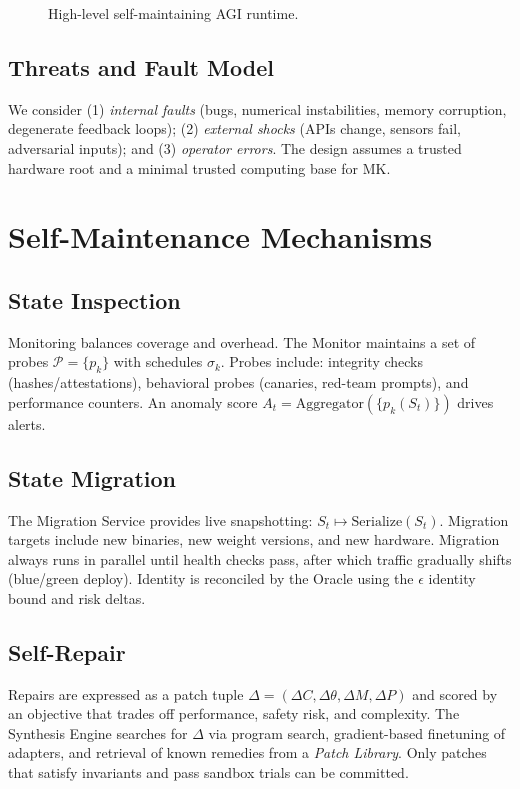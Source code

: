 \documentclass[12pt]{article}
\begin{document}
\begin{figure}[t]
\centering
{}
\caption{High-level self-maintaining AGI runtime.}
\label{fig:arch}
\end{figure}

\subsection{Threats and Fault Model}
We consider (1) \emph{internal faults} (bugs, numerical instabilities, memory corruption, degenerate feedback loops); (2) \emph{external shocks} (APIs change, sensors fail, adversarial inputs); and (3) \emph{operator errors}. The design assumes a trusted hardware root and a minimal trusted computing base for MK.

\section{Self-Maintenance Mechanisms}
\subsection{State Inspection}
Monitoring balances coverage and overhead. The Monitor maintains a set of probes $\mathcal{P}=\{p_k\}$ with schedules $\sigma_k$. Probes include: integrity checks (hashes/attestations), behavioral probes (canaries, red-team prompts), and performance counters. An anomaly score $A_t=\text{Aggregator}(\{p_k(S_t)\})$ drives alerts.

\subsection{State Migration}
The Migration Service provides live snapshotting: $S_t \mapsto \text{Serialize}(S_t)$. Migration targets include new binaries, new weight versions, and new hardware. Migration always runs in parallel until health checks pass, after which traffic gradually shifts (blue/green deploy). Identity is reconciled by the Oracle using the $\epsilon$ identity bound and risk deltas.

\subsection{Self-Repair}
Repairs are expressed as a patch tuple $\Delta=(\Delta C,\Delta \theta,\Delta M,\Delta P)$ and scored by an objective that trades off performance, safety risk, and complexity. The Synthesis Engine searches for $\Delta$ via program search, gradient-based finetuning of adapters, and retrieval of known remedies from a \emph{Patch Library}. Only patches that satisfy invariants and pass sandbox trials can be committed.
\end{document}
